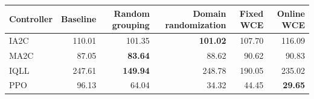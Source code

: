 \begin{tabular}{lrrrrr}
\hline
Controller & Baseline & Random grouping & Domain randomization & Fixed WCE & Online WCE \\
\hline
IA2C & 110.01 & 101.35 & \textbf{101.02} & 107.70 & 116.09 \\
MA2C & 87.05 & \textbf{83.64} & 88.62 & 90.62 & 90.83 \\
IQLL & 247.61 & \textbf{149.94} & 248.78 & 190.05 & 235.02 \\
PPO & 96.13 & 64.04 & 34.32 & 44.45 & \textbf{29.65} \\
\hline
\end{tabular}
